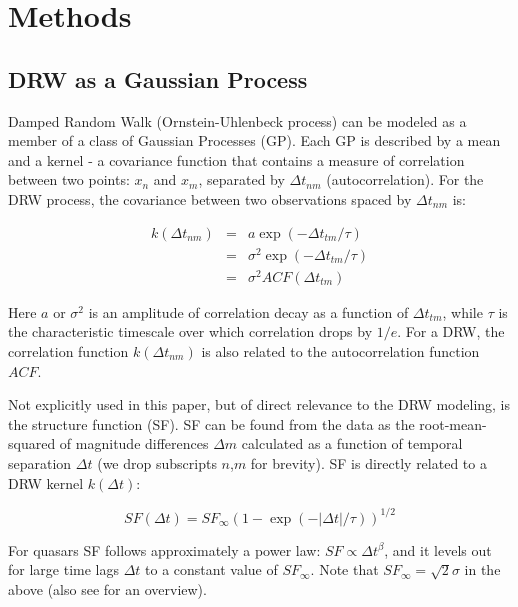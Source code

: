 \documentclass[twocolumn]{aastex62}
\begin{document}
%
%
\section{Methods}\label{sec:methods}
\subsection{DRW as a Gaussian Process}
Damped Random Walk (Ornstein-Uhlenbeck process) can be modeled as a member of a class of Gaussian Processes (GP). Each GP is described by a mean and a kernel - a covariance function that contains a measure of correlation between two points: $x_{n}$ and $x_{m}$, separated by $\Delta t_{nm}$ (autocorrelation). For the  DRW process, the covariance  between two observations spaced by  $\Delta t_{nm}$ is: 

\begin{eqnarray}
k(\Delta t_{nm}) &=& a \exp{(-\Delta t_{tm} / \tau)} \\
                 &=& \sigma^{2}\exp{(-\Delta t_{tm} / \tau)}  \nonumber \\
                 &=& \sigma^{2} ACF(\Delta t_{tm})\nonumber
\end{eqnarray} 

Here $a$ or $\sigma^{2}$ is an amplitude of correlation decay as a function of $\Delta t_{tm}$,  while $\tau$ is the characteristic timescale over which correlation drops by $1/e$. For a DRW,  the correlation function $k(\Delta t_{nm})$ is also related to the autocorrelation function $ACF$. 

Not explicitly used in this paper, but of direct relevance to the DRW modeling, is the structure function (SF). SF can be found from the data as the root-mean-squared of  magnitude differences $\Delta m$  calculated as a function of temporal separation $\Delta t$ (we drop subscripts $n$,$m$ for brevity). SF is directly related to a DRW kernel $k(\Delta t)$:

\begin{equation}
SF(\Delta t) = SF_{\infty} (1-\exp{(-|\Delta t|/\tau)})^{1/2}
\end{equation}

For quasars SF follows approximately a power law: $SF \propto \Delta t^{\beta}$,  and it levels out for large time lags $\Delta t$ to a constant value of $SF_{\infty}$.   Note that $SF_\infty = \sqrt{2} \sigma$  in the above (also see \citet{macleod2012, bauer2009, graham2015a} for an overview).
\end{document}
